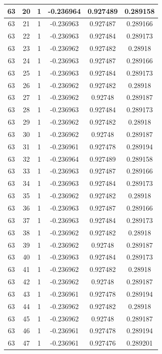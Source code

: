 \documentclass[12pt,a4paper]{article}
\numberwithin{equation}{section}
\numberwithin{figure}{section}
\numberwithin{table}{section}
\begin{document}
\begin{longtable}{|c|c|c|c|c|c|}
63 & 20 & 1 & -0.236964 & 0.927489 & 0.289158 \\ \hline
63 & 21 & 1 & -0.236963 & 0.927487 & 0.289166 \\ \hline
63 & 22 & 1 & -0.236963 & 0.927484 & 0.289173 \\ \hline
63 & 23 & 1 & -0.236962 & 0.927482 & 0.28918 \\ \hline
63 & 24 & 1 & -0.236963 & 0.927487 & 0.289166 \\ \hline
63 & 25 & 1 & -0.236963 & 0.927484 & 0.289173 \\ \hline
63 & 26 & 1 & -0.236962 & 0.927482 & 0.28918 \\ \hline
63 & 27 & 1 & -0.236962 & 0.92748 & 0.289187 \\ \hline
63 & 28 & 1 & -0.236963 & 0.927484 & 0.289173 \\ \hline
63 & 29 & 1 & -0.236962 & 0.927482 & 0.28918 \\ \hline
63 & 30 & 1 & -0.236962 & 0.92748 & 0.289187 \\ \hline
63 & 31 & 1 & -0.236961 & 0.927478 & 0.289194 \\ \hline
63 & 32 & 1 & -0.236964 & 0.927489 & 0.289158 \\ \hline
63 & 33 & 1 & -0.236963 & 0.927487 & 0.289166 \\ \hline
63 & 34 & 1 & -0.236963 & 0.927484 & 0.289173 \\ \hline
63 & 35 & 1 & -0.236962 & 0.927482 & 0.28918 \\ \hline
63 & 36 & 1 & -0.236963 & 0.927487 & 0.289166 \\ \hline
63 & 37 & 1 & -0.236963 & 0.927484 & 0.289173 \\ \hline
63 & 38 & 1 & -0.236962 & 0.927482 & 0.28918 \\ \hline
63 & 39 & 1 & -0.236962 & 0.92748 & 0.289187 \\ \hline
63 & 40 & 1 & -0.236963 & 0.927484 & 0.289173 \\ \hline
63 & 41 & 1 & -0.236962 & 0.927482 & 0.28918 \\ \hline
63 & 42 & 1 & -0.236962 & 0.92748 & 0.289187 \\ \hline
63 & 43 & 1 & -0.236961 & 0.927478 & 0.289194 \\ \hline
63 & 44 & 1 & -0.236962 & 0.927482 & 0.28918 \\ \hline
63 & 45 & 1 & -0.236962 & 0.92748 & 0.289187 \\ \hline
63 & 46 & 1 & -0.236961 & 0.927478 & 0.289194 \\ \hline
63 & 47 & 1 & -0.236961 & 0.927476 & 0.289201 \\ \hline

\end{longtable}
\end{document}
